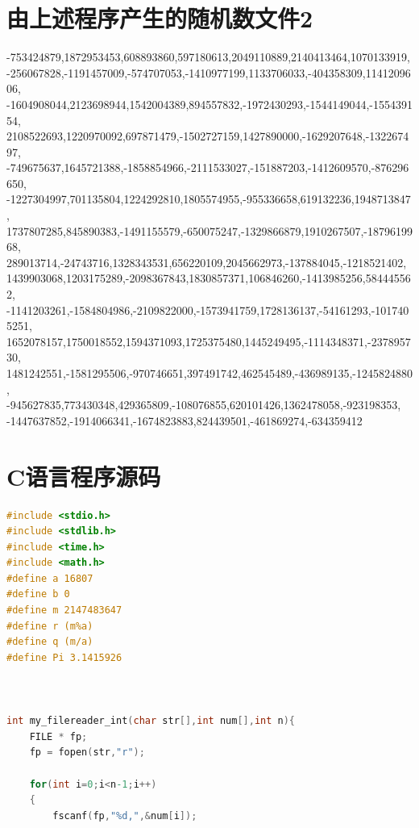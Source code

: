\documentclass[a4paper,11pt]{article}
\begin{document}
\begin{appendices}
\section{由上述程序产生的随机数文件2}
\label{972}
-753424879,1872953453,608893860,597180613,2049110889,2140413464,1070133919,\\
-256067828,-1191457009,-574707053,-1410977199,1133706033,-404358309,1141209606,\\
-1604908044,2123698944,1542004389,894557832,-1972430293,-1544149044,-155439154,\\
2108522693,1220970092,697871479,-1502727159,1427890000,-1629207648,-132267497,\\
-749675637,1645721388,-1858854966,-2111533027,-151887203,-1412609570,-876296650,\\
-1227304997,701135804,1224292810,1805574955,-955336658,619132236,1948713847,\\
1737807285,845890383,-1491155579,-650075247,-1329866879,1910267507,-1879619968,\\
289013714,-24743716,1328343531,656220109,2045662973,-137884045,-1218521402,\\
1439903068,1203175289,-2098367843,1830857371,106846260,-1413985256,584445562,\\
-1141203261,-1584804986,-2109822000,-1573941759,1728136137,-54161293,-1017405251,\\
1652078157,1750018552,1594371093,1725375480,1445249495,-1114348371,-237895730,\\
1481242551,-1581295506,-970746651,397491742,462545489,-436989135,-1245824880,\\
-945627835,773430348,429365809,-108076855,620101426,1362478058,-923198353,\\
-1447637852,-1914066341,-1674823883,824439501,-461869274,-634359412


\section{C语言程序源码}

\begin{lstlisting}[language = C]
#include <stdio.h>
#include <stdlib.h>
#include <time.h>
#include <math.h>
#define a 16807
#define b 0
#define m 2147483647
#define r (m%a)
#define q (m/a)
#define Pi 3.1415926



int my_filereader_int(char str[],int num[],int n){
    FILE * fp;
    fp = fopen(str,"r");

    for(int i=0;i<n-1;i++)
    {
        fscanf(fp,"%d,",&num[i]);


\end{lstlisting}
\end{appendices}
\end{document}
